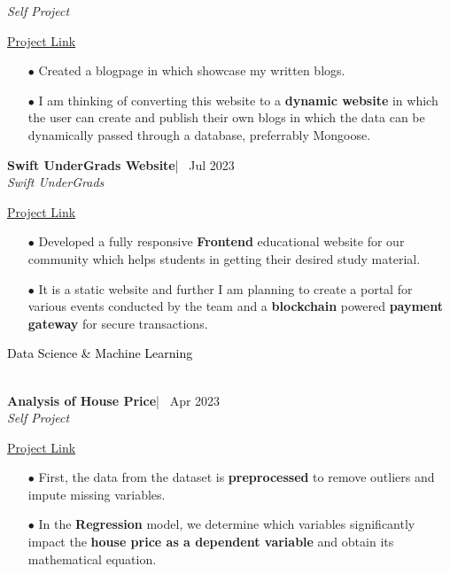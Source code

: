 \documentclass[10.7pt]{article}  %
\begin{document}
\emph{Self Project} \hfill {\href{https://sharathblogs.vercel.app}{\underline{Project Link} }
\\[-0.6cm]	
	\begin{itemize}[itemsep = -0.75 mm]
	\item[{\color[RGB]{10,0,254}$\bullet$}] \noindent Created a blogpage in which showcase my written blogs.
        \item[{\color[RGB]{10,0,254}$\bullet$}] \noindent I am thinking of converting this website to a \textbf{dynamic website} in which the user can create and publish their own blogs in which the data can be dynamically passed through a database, preferrably Mongoose.
	\end{itemize} 
\textbf{\large{Swift UnderGrads Website}}|  \hfill {\ \small Jul 2023}
\\[0.05cm]
\emph{Swift UnderGrads} \hfill {\href{https://www.swiftundergrads.in}{\underline{Project Link} }
\\[-0.6cm]	
	\begin{itemize}[itemsep = -0.75 mm]
	\item[{\color[RGB]{10,0,254}$\bullet$}] \noindent Developed a fully responsive \textbf{Frontend} educational website for our community which helps students in getting their desired study material.
        \item[{\color[RGB]{10,0,254}$\bullet$}] \noindent It is a static website  and further I am planning to create a portal for various events conducted by the team and a \textbf{blockchain} powered \textbf{payment gateway} for secure transactions.
	\end{itemize} 
{\LARGE \textcolor{black}{Data Science \& Machine Learning}}
\vspace{-6.5pt}
\par\noindent\hrulefill %
\\[0.15cm]
\textbf{\large{Analysis of House Price}}|  \hfill {\ \small Apr 2023}
\\[0.05cm]
\emph{Self Project} \hfill {\href{https://github.com/Sharath1036/house-price-analysis}{\underline{Project Link} }
\\[-0.6cm]	
	\begin{itemize}[itemsep = -0.75 mm]
        \item[{\color[RGB]{10,0,254}$\bullet$}] \noindent First, the data from the dataset is \textbf{preprocessed }to remove outliers and impute missing variables.
        \item[{\color[RGB]{10,0,254}$\bullet$}] \noindent In the \textbf{Regression} model, we determine which variables significantly impact the \textbf{house price as a dependent variable} and obtain its mathematical equation.

\end{itemize}}}}
\end{document}
